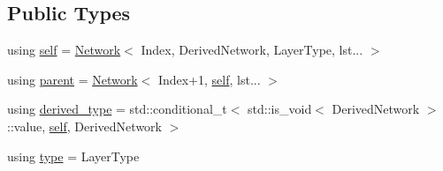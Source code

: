 \subsection*{Public Types}
\begin{DoxyCompactItemize}
\item 
using \hyperlink{structBC_1_1nn_1_1Network_3_01Index_00_01DerivedNetwork_00_01LayerType_00_01lst_8_8_8_01_4_a09152ae5941e765b64e7203c4b86be13}{self} = \hyperlink{structBC_1_1nn_1_1Network}{Network}$<$ Index, Derived\+Network, Layer\+Type, lst... $>$
\item 
using \hyperlink{structBC_1_1nn_1_1Network_3_01Index_00_01DerivedNetwork_00_01LayerType_00_01lst_8_8_8_01_4_a038f3f4682dfb52e16c5baf451376886}{parent} = \hyperlink{structBC_1_1nn_1_1Network}{Network}$<$ Index+1, \hyperlink{structBC_1_1nn_1_1Network_3_01Index_00_01DerivedNetwork_00_01LayerType_00_01lst_8_8_8_01_4_a09152ae5941e765b64e7203c4b86be13}{self}, lst... $>$
\item 
using \hyperlink{structBC_1_1nn_1_1Network_3_01Index_00_01DerivedNetwork_00_01LayerType_00_01lst_8_8_8_01_4_a2d569862e77d1ef47c5d99303b497a3c}{derived\+\_\+type} = std\+::conditional\+\_\+t$<$ std\+::is\+\_\+void$<$ Derived\+Network $>$\+::value, \hyperlink{structBC_1_1nn_1_1Network_3_01Index_00_01DerivedNetwork_00_01LayerType_00_01lst_8_8_8_01_4_a09152ae5941e765b64e7203c4b86be13}{self}, Derived\+Network $>$
\item 
using \hyperlink{structBC_1_1nn_1_1Network_3_01Index_00_01DerivedNetwork_00_01LayerType_00_01lst_8_8_8_01_4_a2c37c2373f485614d0c04bb880cbc0e1}{type} = Layer\+Type
\end{DoxyCompactItemize}
